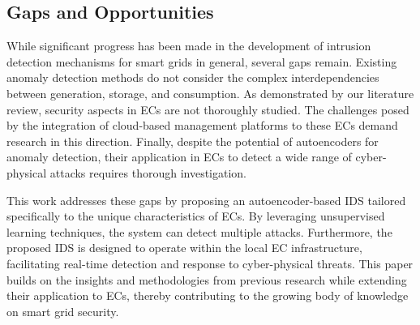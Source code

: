\subsection{Gaps and Opportunities}

While significant progress has been made in the development of intrusion detection mechanisms for smart grids in general, several gaps remain. Existing anomaly detection methods do not consider the complex interdependencies between generation, storage, and consumption. As demonstrated by our literature review, security aspects in ECs are not thoroughly studied. The challenges posed by the integration of cloud-based management platforms to these ECs demand research in this direction. Finally, despite the potential of autoencoders for anomaly detection, their application in ECs to detect a wide range of cyber-physical attacks requires thorough investigation.

This work addresses these gaps by proposing an autoencoder-based IDS tailored specifically to the unique characteristics of ECs. By leveraging unsupervised learning techniques, the system can detect multiple attacks. Furthermore, the proposed IDS is designed to operate within the local EC infrastructure, facilitating real-time detection and response to cyber-physical threats. This paper builds on the insights and methodologies from previous research while extending their application to ECs, thereby contributing to the growing body of knowledge on smart grid security.